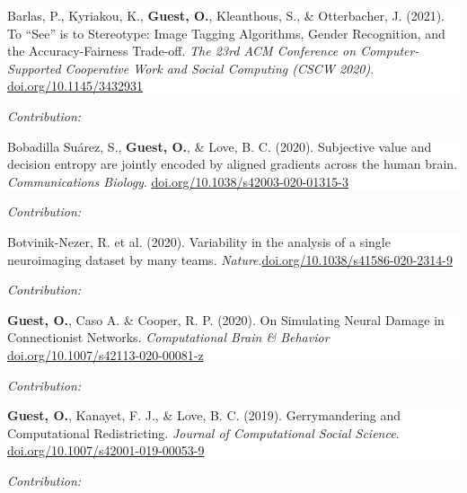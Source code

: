 \documentclass[10pt]{article}
\newcommand{\paper}[2]{\colorbox{white}{\begin{minipage}{\dimexpr\linewidth-2\fboxsep}#1
\end{minipage}}
\if\relax\detokenize{#2}\relax
    \vspace{2pt}
    \else
    \begin{flushright}
    \begin{minipage}{0.99\dimexpr\linewidth-2\fboxsep}\small
    \emph{Contribution:} #2
    \end{minipage}
    \end{flushright}
\fi
}
\begin{document}
\paper{
Barlas, P., Kyriakou, K., \textbf{Guest, O.}, Kleanthous, S., \& Otterbacher, J. (2021). {To ``See'' is to Stereotype: Image Tagging Algorithms, Gender Recognition, and the Accuracy-Fairness Trade-off}. \textit{The 23rd ACM Conference on Computer-Supported Cooperative Work and Social Computing (CSCW 2020)}. \newline\href{https://doi.org/10.1145/3432931}{doi.org/10.1145/3432931}
}{}


\paper{
Bobadilla Suárez, S., \textbf{Guest, O.}, \& Love, B. C. (2020).  {Subjective value and decision entropy are jointly encoded by aligned gradients across the human brain}. \textit{Communications Biology}.
\newline
\href{https://doi.org/10.1038/s42003-020-01315-3}{doi.org/10.1038/s42003-020-01315-3}
}
{}



\paper{Botvinik-Nezer, R. et al. (2020). {Variability in the analysis of a single neuroimaging dataset by many teams}. \textit{Nature}.\newline \href{https://doi.org/10.1038/s41586-020-2314-9}{doi.org/10.1038/s41586-020-2314-9}}
{}

\paper{
\textbf{Guest, O.}, Caso A. \& Cooper, R. P. (2020).  {On Simulating Neural Damage in Connectionist Networks}. \textit{Computational Brain \& Behavior} \newline
 \href{https://doi.org/10.1007/s42113-020-00081-z}{doi.org/10.1007/s42113-020-00081-z}}
 {}

\paper{\textbf{Guest, O.}, Kanayet, F. J., \& Love, B. C. (2019). {Gerrymandering and Computational Redistricting}. \textit{Journal of Computational Social Science}. \newline
\href{https://dx.doi.org/10.1007/s42001-019-00053-9}{doi.org/10.1007/s42001-019-00053-9}}
{}
\end{document}
